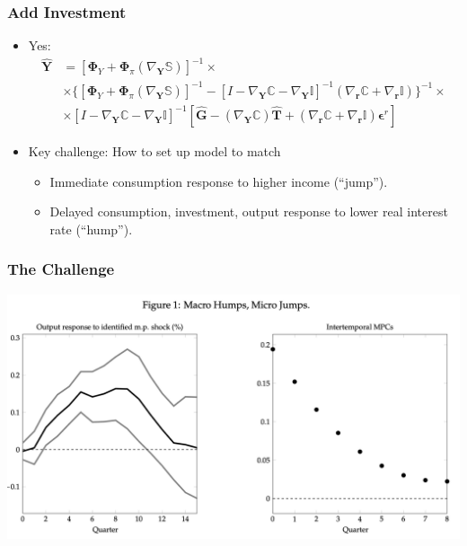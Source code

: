 \documentclass[english,xcolor=svgnames]{beamer}
\begin{document}
\begin{frame}
    \frametitle{Add Investment}
    \begin{itemize}
        \item Yes:
        \begin{align*}
             \bm{\hat{Y}} &=  [ \bm{\Phi}_Y  +  \bm{\Phi}_\pi (\nabla_{\bm{Y}}\pmb{\mathbb{S}}) ]^{-1} \times \\
             &\times \{[ \bm{\Phi}_Y  +  \bm{\Phi}_\pi (\nabla_{\bm{Y}}\pmb{\mathbb{S}}) ]^{-1} - [I - \nabla_{\bm{Y}}\pmb{\mathbb{C}} - \nabla_{\bm{Y}}\pmb{\mathbb{I}} ]^{-1}(\nabla_{\bm{r}}\pmb{\mathbb{C}} + \nabla_{\bm{r}}\pmb{\mathbb{I}})  \}^{-1}  \times\\ 
             &\times[I - \nabla_{\bm{Y}}\pmb{\mathbb{C}}- \nabla_{\bm{Y}}\pmb{\mathbb{I}}]^{-1} [\bm{\hat{G}} - (\nabla_{\bm{Y}}\pmb{\mathbb{C}})\bm{\hat{T}} + (\nabla_{\bm{r}}\pmb{\mathbb{C}}+\nabla_{\bm{r}}\pmb{\mathbb{I}})\bm{\epsilon}^r ]  
         \end{align*}
        \item Key challenge: How to set up model to match 
        \begin{itemize}
        	\item Immediate consumption response to higher income (``jump'').
        	\item Delayed consumption, investment, output response to lower real interest rate (``hump'').
        \end{itemize}
    \end{itemize}
\end{frame}


\begin{frame}
    \frametitle{The Challenge}
    \begin{center}
    \includegraphics[scale=0.3]{figures/ARSFIG1.png}
    \end{center}
\end{frame}
\end{document}
